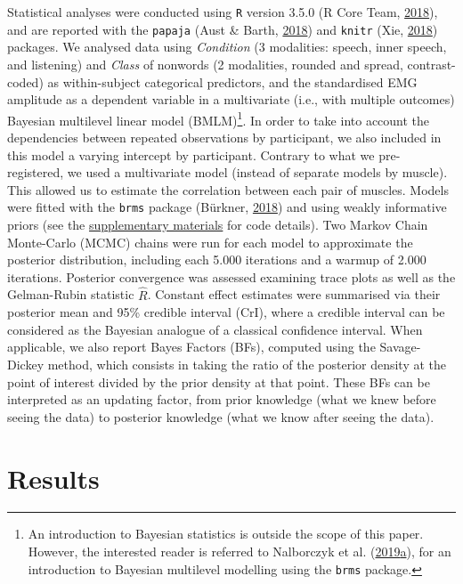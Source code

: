 \documentclass[a4paper,12pt,twoside,openright,oldfontcommands]{memoir}
\let\rmarkdownfootnote\footnote%
\def\footnote{\protect\rmarkdownfootnote}
\begin{document}
Statistical analyses were conducted using \texttt{R} version 3.5.0 (R Core Team, \protect\hyperlink{ref-R-base}{2018}), and are reported with the \texttt{papaja} (Aust \& Barth, \protect\hyperlink{ref-R-papaja}{2018}) and \texttt{knitr} (Xie, \protect\hyperlink{ref-R-knitr}{2018}) packages. We analysed data using \emph{Condition} (3 modalities: speech, inner speech, and listening) and \emph{Class} of nonwords (2 modalities, rounded and spread, contrast-coded) as within-subject categorical predictors, and the standardised EMG amplitude as a dependent variable in a multivariate (i.e., with multiple outcomes) Bayesian multilevel linear model (BMLM)\footnote{An introduction to Bayesian statistics is outside the scope of this paper. However, the interested reader is referred to Nalborczyk et al. (\protect\hyperlink{ref-nalborczyk_introduction_2019}{2019}\protect\hyperlink{ref-nalborczyk_introduction_2019}{a}), for an introduction to Bayesian multilevel modelling using the \texttt{brms} package.}. In order to take into account the dependencies between repeated observations by participant, we also included in this model a varying intercept by participant. Contrary to what we pre-registered, we used a multivariate model (instead of separate models by muscle). This allowed us to estimate the correlation between each pair of muscles. Models were fitted with the \texttt{brms} package (Bürkner, \protect\hyperlink{ref-R-brms}{2018}) and using weakly informative priors (see the \protect\hyperlink{suppCh5}{supplementary materials} for code details). Two Markov Chain Monte-Carlo (MCMC) chains were run for each model to approximate the posterior distribution, including each 5.000 iterations and a warmup of 2.000 iterations. Posterior convergence was assessed examining trace plots as well as the Gelman-Rubin statistic \(\hat{R}\). Constant effect estimates were summarised via their posterior mean and 95\% credible interval (CrI), where a credible interval can be considered as the Bayesian analogue of a classical confidence interval. When applicable, we also report Bayes Factors (BFs), computed using the Savage-Dickey method, which consists in taking the ratio of the posterior density at the point of interest divided by the prior density at that point. These BFs can be interpreted as an updating factor, from prior knowledge (what we knew before seeing the data) to posterior knowledge (what we know after seeing the data).

\hypertarget{results-2}{%
\section{Results}\label{results-2}}
\end{document}
